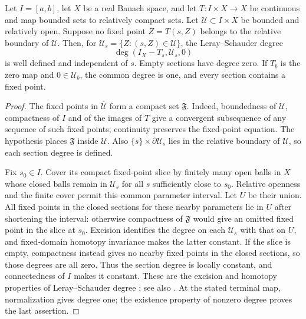 \begin{lemma}\label{b:lem:moving-degree}
Let $I=[a,b]$, let $X$ be a real Banach space, and let
$T:I\times X\to X$ be continuous and map bounded sets to relatively
compact sets. Let $\mathcal U\subset I\times X$ be bounded and
relatively open. Suppose no fixed point $Z=T(s,Z)$ belongs to the
relative boundary of $\mathcal U$. Then, for
$\mathcal U_s=\{Z:(s,Z)\in\mathcal U\}$, the Leray--Schauder degree
\[
 \deg(I_X-T_s,\mathcal U_s,0)
\]
is well defined and independent of $s$. Empty sections have degree zero.
If $T_b$ is the zero map and $0\in\mathcal U_b$, the common degree
is one, and every section contains a fixed point.
\end{lemma}

\begin{proof}
The fixed points in $\overline{\mathcal U}$ form a compact set
$\mathfrak F$. Indeed, boundedness of $\mathcal U$, compactness of $I$
and of the images of $T$ give a convergent subsequence of any sequence
of such fixed points; continuity preserves the fixed-point equation.
The hypothesis places $\mathfrak F$ inside $\mathcal U$.
Also $\{s\}\times\partial\mathcal U_s$ lies in the relative boundary
of $\mathcal U$, so each section degree is defined.

Fix $s_0\in I$. Cover its compact fixed-point slice by finitely many
open balls in $X$ whose closed balls remain in $\mathcal U_s$ for
all $s$ sufficiently close to $s_0$. Relative openness and the finite
cover permit this common parameter interval. Let $U$ be their union.
All fixed points in the closed sections for these nearby parameters
lie in $U$ after shortening the interval: otherwise compactness of
$\mathfrak F$ would give an omitted fixed point in the slice at $s_0$.
Excision identifies the degree on each $\mathcal U_s$ with that on
$U$, and fixed-domain homotopy invariance makes the latter constant.
If the slice is empty, compactness instead gives no nearby fixed
points in the closed sections, so those degrees are all zero.
Thus the section degree is locally constant, and connectedness of $I$
makes it constant. These are the excision and homotopy properties of
Leray--Schauder degree
\cite[Sections~12--14, pp.~59--61]{LeraySchauder1934}; see also \cite{Deimling1985}.
At the stated terminal map, normalization gives degree one; the
existence property of nonzero degree proves the last assertion.
\end{proof}

